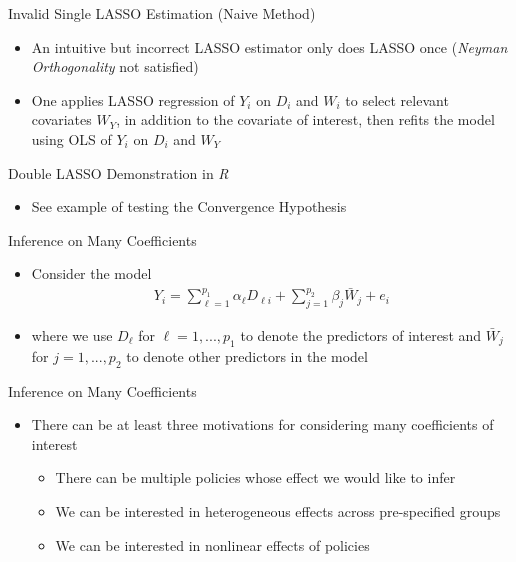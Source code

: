 \documentclass[aspectratio=1610,12pt,xcolor=dvipsnames]{beamer}
\begin{document}
\begin{frame}{Invalid Single LASSO Estimation (Naive Method)}

\begin{itemize}
    \item An intuitive but incorrect LASSO estimator only does LASSO once (\textit{Neyman Orthogonality} not satisfied)
    \item One applies LASSO regression of $Y_i$ on $D_i$ and $W_i$ to select relevant covariates $W_Y$, in addition to the covariate of interest, then refits the model using OLS of $Y_i$ on $D_i$ and $W_Y$
\end{itemize}
\end{frame}

\begin{frame}{Double LASSO Demonstration in \textit{R}}

\begin{itemize}
    \item See example of testing the Convergence Hypothesis
\end{itemize}
    
\end{frame}

\begin{frame}{Inference on Many Coefficients}

\begin{itemize}
    \item Consider the model
    \begin{align*}
        Y_i = \sum_{\ell=1}^{p_1} \alpha_{\ell}D_{\ell i} + \sum_{j=1}^{p_2} \beta_j \bar W_j + e_i
    \end{align*}
    \item where we use $D_{\ell}$ for $\ell = 1,...,p_1$ to denote the predictors of interest and $\bar W_{j}$ for $j = 1,...,p_2$ to denote other predictors in the model
\end{itemize}
\end{frame}

\begin{frame}{Inference on Many Coefficients}

\begin{itemize}
    \item There can be at least three motivations for considering many coefficients of interest
    \begin{itemize}
        \item There can be multiple policies whose effect we would like to infer
        \item We can be interested in heterogeneous effects across pre-specified groups
        \item We can be interested in nonlinear effects of policies
    \end{itemize}
\end{itemize}
\end{frame}
\end{document}
